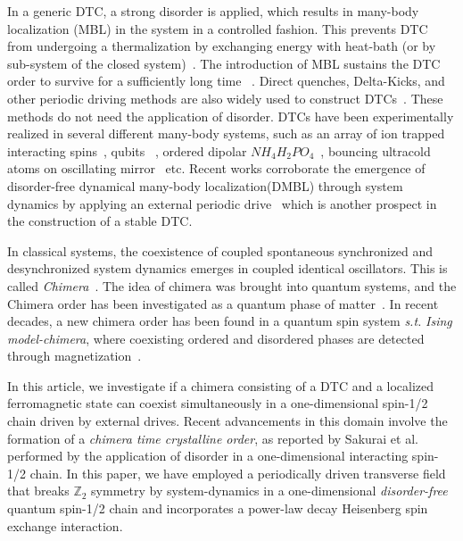 \documentclass[%
reprint,
superscriptaddress,
amsmath,amssymb,showkeys,
aps,
prb,
]{revtex4-2}
\begin{document}
	In a generic DTC, a strong disorder is applied, which results in many-body localization (MBL) in the system in a controlled fashion. This prevents DTC from undergoing a thermalization by exchanging energy with heat-bath (or by sub-system of the closed system)~\cite{alet_many-body_2018,else_floquet_2016,smith_many-body_2016,nguyen_signature_2021}. The introduction of MBL sustains the DTC order to survive for a sufficiently long time ~\cite{zhang_observation_2017}. Direct quenches, Delta-Kicks, and other periodic driving methods are also widely used to construct DTCs~\cite{else_prethermal_2017, russomanno_spin_2017, ho_critical_2017, yu2019, russomanno_floquet_2017}. These methods do not need the application of disorder. DTCs have been experimentally realized in several different many-body systems, such as an array of ion trapped interacting spins~\cite{huang2018,taheri_all-optical_2022, Soham2018, zhang_observation_2017, yao_time_2018,sacha_modeling_2015}, qubits ~\cite{frey_realization_2022}, ordered dipolar $NH_4H_2PO_4$~\cite{rovny_observation_2018}, bouncing ultracold atoms on oscillating mirror~\cite{sacha_time_nodate,golletz_basis_2022} etc. Recent works corroborate the emergence of disorder-free dynamical many-body localization(DMBL) through system dynamics by applying an external periodic drive~\cite{Keser2016, haldar_dynamical_2017, haldar_dynamical_2021,bhattacharyya_transverse_2012,aditya2023dynamical,dutta2014,das_exotic_2010} which is another prospect in the construction of a stable DTC.
	
	In classical systems, the coexistence of coupled spontaneous synchronized and desynchronized system dynamics emerges in coupled identical oscillators. This is called \textit{Chimera}~\cite{kuramoto_coexistence_2002, panaggio_chimera_2015, parastesh_chimeras_2021}. The idea of chimera was brought into quantum systems, and the Chimera order has been investigated as a quantum phase of matter~\cite{bastidas_quantum_2015}. In recent decades, a new chimera order has been found in a quantum spin system \textit{s.t.} \textit{Ising model-chimera}, where coexisting ordered and disordered phases are detected through magnetization~\cite{singh_chimera_2011}.  
	
	In this article, we investigate if a chimera consisting of a DTC and a localized ferromagnetic state can coexist simultaneously in a one-dimensional spin-1/2 chain driven by external drives. Recent advancements in this domain involve the formation of a \textit{chimera time crystalline order}, as reported by Sakurai et al.~\cite{sakurai_phys_nodate} performed by the application of disorder in a one-dimensional interacting spin-1/2 chain. In this paper, we have employed a periodically driven transverse field that breaks $\mathbb{Z}_2$ symmetry by system-dynamics in a one-dimensional \textit{disorder-free} quantum spin-1/2 chain and incorporates a power-law decay Heisenberg spin exchange interaction.
	
\end{document}
